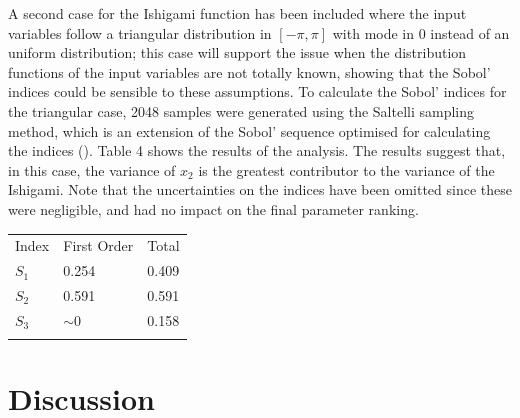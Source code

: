 \documentclass[twocolumn]{rps-esrel2022}
\begin{document}
A second case for the Ishigami function has been included where the input variables follow a triangular distribution in $[-\pi,\pi]$ with mode in $0$
instead of an uniform distribution; this case will support the issue when the distribution functions of the input variables are not totally known, showing
that the Sobol' indices could be sensible to these assumptions.
To calculate the Sobol' indices for the triangular case, 2048 samples were generated using the Saltelli sampling method, which is an extension of the Sobol'
sequence optimised for calculating the indices (\cite{saltelli2002making}).
Table 4 shows the results of the analysis.
The results suggest that, in this case, the variance of $x_2$ is the greatest contributor to the variance of the Ishigami.
Note that the uncertainties on the indices have been omitted since these were negligible, and had no impact on the final parameter ranking.

\begin{table}[!h]
	{
	\begin{tabular}{@{}lll@{}}\toprule
	Index & First Order & Total\\
\colrule

	$S_1$ & 0.254 & 0.409\\
	$S_2$ & 0.591 & 0.591\\
	$S_3$ & $\sim0$ & 0.158\\
\botrule
	\end{tabular}}

\end{table}

\section{Discussion}
\end{document}
